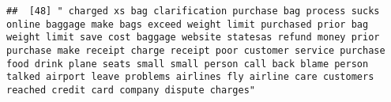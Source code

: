 \documentclass[
]{article}
\begin{document}
\begin{verbatim}
##  [48] " charged xs bag clarification purchase bag process sucks online baggage make bags exceed weight limit purchased prior bag weight limit save cost baggage website statesas refund money prior purchase make receipt charge receipt poor customer service purchase food drink plane seats small small person call back blame person talked airport leave problems airlines fly airline care customers reached credit card company dispute charges"                                                                                                                                                                                                                                                                                                                                                                                                                                                                                                                                                                                                                                                                                                                                                                                                                                                                                                                                                                                                                                                                                                                                                                                                                                                                                                                                               

\end{verbatim}
\end{document}
